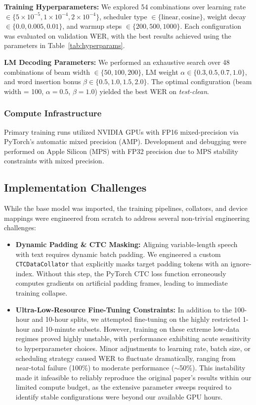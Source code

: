 \documentclass[conference]{IEEEtran}
\begin{document}
\textbf{Training Hyperparameters:} We explored 54 combinations over learning rate $\in \{5 \times 10^{-5}, 1 \times 10^{-4}, 2 \times 10^{-4}\}$, scheduler type $\in \{\text{linear}, \text{cosine}\}$, weight decay $\in \{0.0, 0.005, 0.01\}$, and warmup steps $\in \{200, 500, 1000\}$.
Each configuration was evaluated on validation WER, with the best results achieved using the parameters in Table~\ref{tab:hyperparams}.

\textbf{LM Decoding Parameters:} We performed an exhaustive search over 48 combinations of beam width $\in \{50, 100, 200\}$, LM weight $\alpha \in \{0.3, 0.5, 0.7, 1.0\}$, and word insertion bonus $\beta \in \{0.5, 1.0, 1.5, 2.0\}$.
The optimal configuration (beam width = 100, $\alpha = 0.5$, $\beta = 1.0$) yielded the best WER on \textit{test-clean}.

\subsubsection{Compute Infrastructure}
Primary training runs utilized NVIDIA GPUs with FP16 mixed-precision via PyTorch's automatic mixed precision (AMP).
Development and debugging were performed on Apple Silicon (MPS) with FP32 precision due to MPS stability constraints with mixed precision.

\subsection{Implementation Challenges}
While the base model was imported, the training pipelines, collators, and device mappings were engineered from scratch to address several non-trivial engineering challenges:
\begin{itemize}
    \item \textbf{Dynamic Padding \& CTC Masking:} Aligning variable-length speech with text requires dynamic batch padding.
    We engineered a custom \texttt{CTCDataCollator} that explicitly masks target padding tokens with an ignore-index.
    Without this step, the PyTorch CTC loss function erroneously computes gradients on artificial padding frames, leading to immediate training collapse.
    \item \textbf{Ultra-Low-Resource Fine-Tuning Constraints:} In addition to the 100-hour and 10-hour splits, we attempted fine-tuning on the highly restricted 1-hour and 10-minute subsets.
    However, training on these extreme low-data regimes proved highly unstable, with performance exhibiting acute sensitivity to hyperparameter choices.
    Minor adjustments to learning rate, batch size, or scheduling strategy caused WER to fluctuate dramatically, ranging from near-total failure (100\%) to moderate performance ($\sim$50\%).
    This instability made it infeasible to reliably reproduce the original paper's results within our limited compute budget, as the extensive parameter sweeps required to identify stable configurations were beyond our available GPU hours.
\end{itemize}
\end{document}
